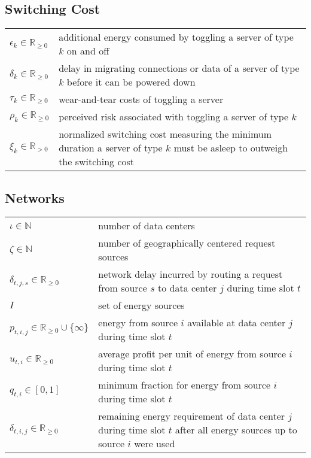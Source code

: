 \subsection*{Switching Cost}

\begin{tabularx}{\textwidth}{lX}
    $\epsilon_k \in \mathbb{R}_{\geq 0}$ & additional energy consumed by toggling a server of type $k$ on and off \\
    $\delta_k \in \mathbb{R}_{\geq 0}$ & delay in migrating connections or data of a server of type $k$ before it can be powered down \\
    $\tau_k \in \mathbb{R}_{\geq 0}$ & wear-and-tear costs of toggling a server \\
    $\rho_k \in \mathbb{R}_{\geq 0}$ & perceived risk associated with toggling a server of type $k$ \\
    $\xi_k \in \mathbb{R}_{>0}$ & normalized switching cost measuring the minimum duration a server of type $k$ must be asleep to outweigh the switching cost \\
\end{tabularx}

\subsection*{Networks}

\begin{tabularx}{\textwidth}{lX}
    $\iota \in \mathbb{N}$ & number of data centers \\
    $\zeta \in \mathbb{N}$ & number of geographically centered request sources \\
    $\delta_{t,j,s} \in \mathbb{R}_{\geq 0}$ & network delay incurred by routing a request from source $s$ to data center $j$ during time slot $t$ \\
    $I$ & set of energy sources \\
    $p_{t,i,j} \in \mathbb{R}_{\geq 0} \cup \{\infty\}$ & energy from source $i$ available at data center $j$ during time slot $t$ \\
    $u_{t,i} \in \mathbb{R}_{\geq 0}$ & average profit per unit of energy from source $i$ during time slot $t$ \\
    $q_{t,i} \in [0,1]$ & minimum fraction for energy from source $i$ during time slot $t$ \\
    $\delta_{t,i,j} \in \mathbb{R}_{\geq 0}$ & remaining energy requirement of data center $j$ during time slot $t$ after all energy sources up to source $i$ were used \\
\end{tabularx}


